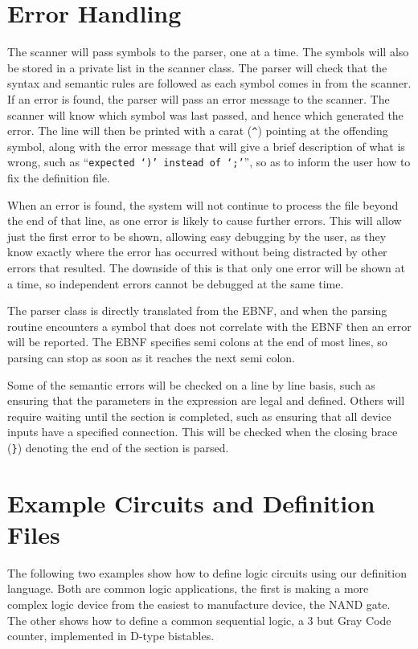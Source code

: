 \documentclass[a4paper,11pt]{article}  %
\begin{document}
\section{Error Handling}

The scanner will pass symbols to the parser, one at a time. The
symbols will also be stored in a private list in the scanner
class. The parser will check that the syntax and semantic rules are
followed as each symbol comes in from the scanner. If an error is
found, the parser will pass an error message to the scanner. The
scanner will know which symbol was last passed, and hence which
generated the error. The line will then be printed with a carat
(\verb+^+) pointing at the offending symbol, along with the error
message that will give a brief description of what is wrong, such as
``\texttt{expected `)' instead of `;'}'', so as to inform the user how
to fix the definition file.

When an error is found, the system will not continue to process the
file beyond the end of that line, as one error is likely to cause
further errors. This will allow just the first error to be shown,
allowing easy debugging by the user, as they know exactly where the
error has occurred without being distracted by other errors that
resulted. The downside of this is that only one error will be shown at
a time, so independent errors cannot be debugged at the same time. 

The parser class is directly translated from the EBNF, and when the
parsing routine encounters a symbol that does not correlate with the
EBNF then an error will be reported. The EBNF specifies
semi colons at the end of most lines, so parsing can stop as soon as
it reaches the next semi colon.

Some of the semantic errors will be checked on a line by line basis,
such as ensuring that the parameters in the expression are legal and
defined. Others will require waiting until the section is completed,
such as ensuring that all device inputs have a specified
connection. This will be checked when the closing brace (\verb+}+)
denoting the end of the section is parsed.

\section{Example Circuits and Definition Files}

The following two examples show how to define logic circuits using our
definition language. Both are common logic applications, the first is
making a more complex logic device from the easiest to manufacture
device, the NAND gate. The other shows how to define a common
sequential logic, a 3 but Gray Code counter, implemented in D-type
bistables.
\end{document}
